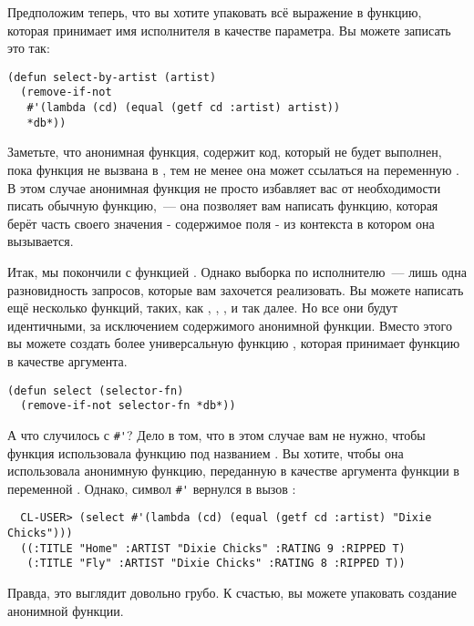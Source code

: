 Предположим теперь, что вы хотите упаковать всё выражение в функцию, которая принимает имя
исполнителя в качестве параметра. Вы можете записать это так:

\begin{lstlisting}
(defun select-by-artist (artist)
  (remove-if-not
   #'(lambda (cd) (equal (getf cd :artist) artist))
   *db*))
\end{lstlisting}

Заметьте, что анонимная функция, содержит код, который не будет выполнен, пока функция не
вызвана в , тем не менее она может ссылаться на переменную
. В этом случае анонимная функция не просто избавляет вас от необходимости
писать обычную функцию,~--- она позволяет вам написать функцию, которая берёт часть своего
значения - содержимое поля  - из контекста в котором она вызывается.

Итак, мы покончили с функцией . Однако выборка по исполнителю~---
лишь одна разновидность запросов, которые вам захочется реализовать. Вы можете написать
ещё несколько функций, таких, как , ,
, и так далее. Но все они будут идентичными, за
исключением содержимого анонимной функции. Вместо этого вы можете создать более
универсальную функцию , которая принимает функцию в качестве аргумента.

\begin{lstlisting}
(defun select (selector-fn)
  (remove-if-not selector-fn *db*))
\end{lstlisting}

А что случилось с \lstinline!#'!? Дело в том, что в этом случае вам не нужно, чтобы функция
 использовала функцию под названием . Вы хотите,
чтобы она использовала анонимную функцию, переданную в качестве аргумента функции
 в переменной . Однако, символ \lstinline!#'! вернулся в вызов
:

\begin{verbatim}
  CL-USER> (select #'(lambda (cd) (equal (getf cd :artist) "Dixie Chicks")))
  ((:TITLE "Home" :ARTIST "Dixie Chicks" :RATING 9 :RIPPED T)
   (:TITLE "Fly" :ARTIST "Dixie Chicks" :RATING 8 :RIPPED T))
\end{verbatim}

Правда, это выглядит довольно грубо. К счастью, вы можете упаковать создание анонимной функции.

